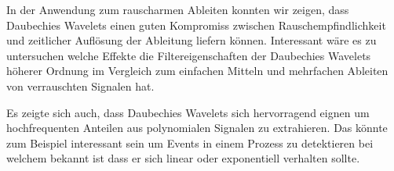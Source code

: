 \begin{refsection}
In der Anwendung zum rauscharmen Ableiten konnten wir zeigen, dass Daubechies
Wavelets einen guten Kompromiss zwischen Rauschempfindlichkeit und zeitlicher
Auflösung der Ableitung liefern können. Interessant wäre es zu untersuchen
welche Effekte die Filtereigenschaften der Daubechies Wavelets höherer Ordnung
im Vergleich zum einfachen Mitteln und mehrfachen Ableiten von verrauschten
Signalen hat.

Es zeigte sich auch, dass Daubechies Wavelets sich hervorragend eignen um
hochfrequenten Anteilen aus polynomialen Signalen zu extrahieren. Das könnte
zum Beispiel interessant sein um Events in einem Prozess zu detektieren bei
welchem bekannt ist dass er sich linear oder exponentiell verhalten sollte.

\printbibliography[heading=subbibliography]
\end{refsection}
